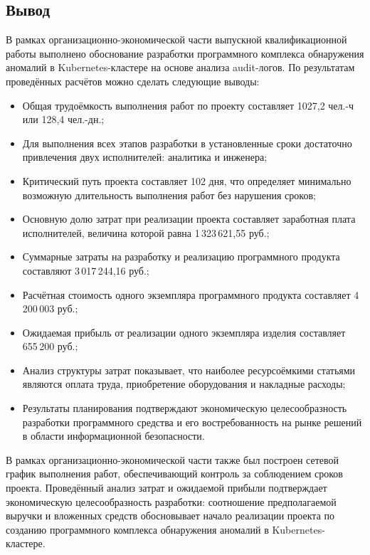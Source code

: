 \subsection{Вывод}

В рамках организационно-экономической части выпускной квалификационной работы выполнено обоснование разработки программного комплекса обнаружения аномалий в Kubernetes-кластере на основе анализа audit-логов. По результатам проведённых расчётов можно сделать следующие выводы:

\begin{itemize}
    \item Общая трудоёмкость выполнения работ по проекту составляет 1027,2 чел.-ч или 128,4 чел.-дн.;
    \item Для выполнения всех этапов разработки в установленные сроки достаточно привлечения двух исполнителей: аналитика и инженера;
    \item Критический путь проекта составляет 102 дня, что определяет минимально возможную длительность выполнения работ без нарушения сроков;
    \item Основную долю затрат при реализации проекта составляет заработная плата исполнителей, величина которой равна 1\,323\,621,55 руб.;
    \item Суммарные затраты на разработку и реализацию программного продукта составляют 3\,017\,244,16 руб.;
    \item Расчётная стоимость одного экземпляра программного продукта составляет 4\,200\,003 руб.;
    \item Ожидаемая прибыль от реализации одного экземпляра изделия составляет 655\,200 руб.;
    \item Анализ структуры затрат показывает, что наиболее ресурсоёмкими статьями являются оплата труда, приобретение оборудования и накладные расходы;
    \item Результаты планирования подтверждают экономическую целесообразность разработки программного средства и его востребованность на рынке решений в области информационной безопасности.
\end{itemize}

В рамках организационно-экономической части также был построен сетевой график выполнения работ, обеспечивающий контроль за соблюдением сроков проекта. Проведённый анализ затрат и ожидаемой прибыли подтверждает экономическую целесообразность разработки: соотношение предполагаемой выручки и вложенных средств обосновывает начало реализации проекта по созданию программного комплекса обнаружения аномалий в Kubernetes-кластере.